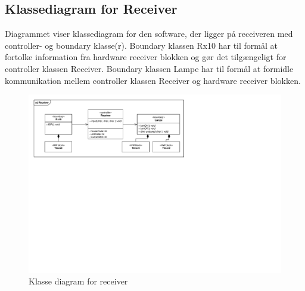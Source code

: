 \subsection{Klassediagram for Receiver}
Diagrammet viser klassediagram for den software, der ligger på receiveren med controller- og boundary klasse(r). Boundary klassen Rx10 har til formål at fortolke information fra hardware receiver blokken og gør det tilgængeligt for controller klassen Receiver. Boundary klassen Lampe har til formål at formidle kommunikation mellem controller klassen Receiver og hardware receiver blokken.
\begin{figure}[h]
	\centering 
	\includegraphics[width=\textwidth, trim=17 385 324 17, clip=true]{Systemarkitektur/Diagrammer/Receiver_Klassediagram.pdf}
	\caption{Klasse diagram for receiver}
	\label{fig:Rec_klasse}
\end{figure}

\clearpage